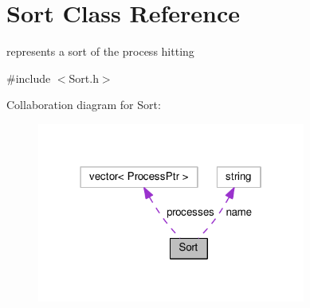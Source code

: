 \hypertarget{classSort}{\section{Sort Class Reference}
\label{classSort}
}


represents a sort of the process hitting  




{\ttfamily \#include $<$Sort.\+h$>$}



Collaboration diagram for Sort\+:\nopagebreak
\begin{figure}[H]
\begin{center}
\leavevmode
\includegraphics[width=250pt]{classSort__coll__graph}
\end{center}
\end{figure}
